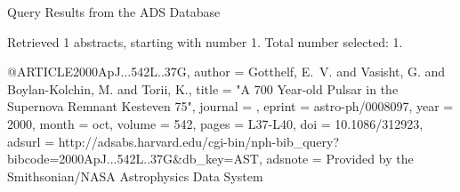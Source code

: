 Query Results from the ADS Database


Retrieved 1 abstracts, starting with number 1.  Total number selected: 1.

@ARTICLE{2000ApJ...542L..37G,
   author = {{Gotthelf}, E.~V. and {Vasisht}, G. and {Boylan-Kolchin}, M. and 
	{Torii}, K.},
    title = "{A 700 Year-old Pulsar in the Supernova Remnant Kesteven 75}",
  journal = {\apjl},
   eprint = {astro-ph/0008097},
     year = 2000,
    month = oct,
   volume = 542,
    pages = {L37-L40},
      doi = {10.1086/312923},
   adsurl = {http://adsabs.harvard.edu/cgi-bin/nph-bib_query?bibcode=2000ApJ...542L..37G&db_key=AST},
  adsnote = {Provided by the Smithsonian/NASA Astrophysics Data System}
}


